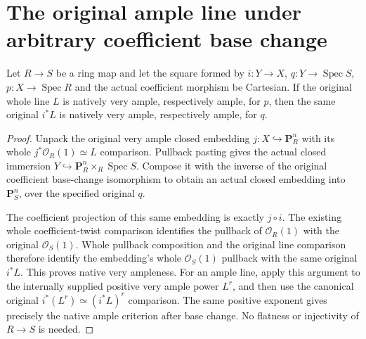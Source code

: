 \section{The original ample line under arbitrary coefficient base change}

\begin{theorem}
\label{thm:pl-auxiliary-native-ampleness-base-change}
\leanok
{}
Let $R\to S$ be a ring map and let the square formed by
$i:Y\to X$, $q:Y\to\operatorname{Spec}S$,
$p:X\to\operatorname{Spec}R$ and the actual coefficient morphism
be Cartesian. If the original whole line $L$ is natively very
ample, respectively ample, for $p$, then the same original $i^*L$
is natively very ample, respectively ample, for $q$.
\end{theorem}
\begin{proof}
\leanok
Unpack the original very ample closed embedding
$j:X\hookrightarrow\mathbf P_R^n$ with its whole
$j^*\mathcal O_R(1)\simeq L$ comparison. Pullback pasting gives
the actual closed immersion
$Y\hookrightarrow\mathbf P_R^n\times_R\operatorname{Spec}S$.
Compose it with the inverse of the original coefficient
base-change isomorphism to obtain an actual closed embedding into
$\mathbf P_S^n$, over the specified original $q$.

The coefficient projection of this same embedding is exactly
$j\circ i$. The existing whole coefficient-twist comparison
identifies the pullback of $\mathcal O_R(1)$ with the original
$\mathcal O_S(1)$. Whole pullback composition and the original
line comparison therefore identify the embedding's whole
$\mathcal O_S(1)$ pullback with the same original $i^*L$.
This proves native very ampleness. For an ample line, apply this
argument to the internally supplied positive very ample power
$L^r$, and then use the canonical original
$i^*(L^r)\simeq(i^*L)^r$ comparison. The same positive exponent
gives precisely the native ample criterion after base change.
No flatness or injectivity of $R\to S$ is needed.
\end{proof}
